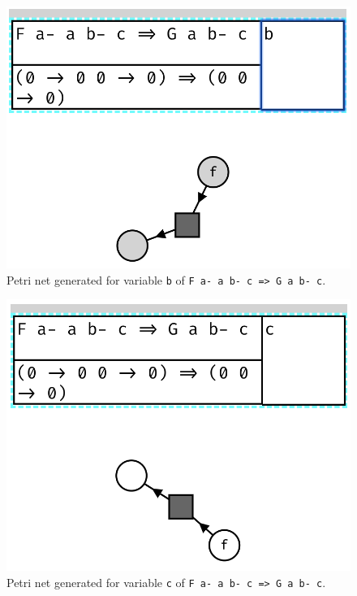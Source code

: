 \documentclass[11pt,openright,hidelinks,a4paper]{article}
\begin{document}
\begin{figure}[H]
\begin{center}
\includegraphics[scale=0.45]{typeb}
\end{center}
\caption{Petri net generated for variable \lstinline{b} of \lstinline{F a- a b- c => G a b- c}.}
\label{fig:typeb}
\end{figure}

\begin{figure}[H]
\begin{center}
\includegraphics[scale=0.45]{typec}
\end{center}
\caption{Petri net generated for variable \lstinline{c} of \lstinline{F a- a b- c => G a b- c}.}
\label{fig:typec}
\end{figure}
\end{document}
